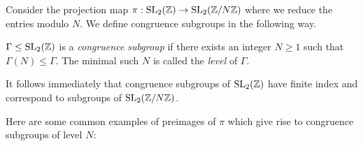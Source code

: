 Consider the projection map $\pi: \operatorname{SL}_2(\mathbb{Z}) \rightarrow \operatorname{SL}_2(\mathbb{Z}/N\mathbb{Z})$ where we reduce the entries modulo $N$. We define congruence subgroups in the following way.

\begin{defn}
$\Gamma \leq \operatorname{SL}_2(\mathbb{Z})$ is a \textit{congruence subgroup} if there exists an integer $N \geq 1$ such that $\Gamma(N) \leq \Gamma$. The minimal such $N$ is called the \textit{level} of $\Gamma$.

It follows immediately that congruence subgroups of $\operatorname{SL}_2(\mathbb{Z})$ have finite index and correspond to subgroups of $\operatorname{SL}_2(\mathbb{Z}/N\mathbb{Z})$.
\end{defn}

\begin{example}\label{example:1_congsgp}
Here are some common examples of preimages of $\pi$ which give rise to congruence subgroups of level $N$:


\end{example}
